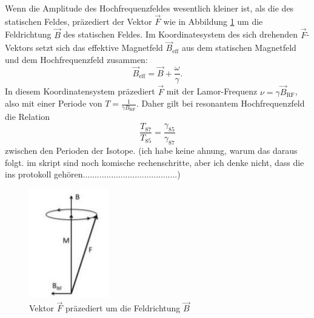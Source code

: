 Wenn die Amplitude des Hochfrequenzfeldes wesentlich kleiner ist, als die des statischen Feldes, präzediert der Vektor $\vec F$ wie in Abbildung \ref{abb:8} um die Feldrichtung $\vec{B}$ des statischen Feldes.
Im Koordinatesystem des sich drehenden $\vec{F}$-Vektors setzt sich das effektive Magnetfeld $\vec{B}_\text{eff}$ aus dem statischen Magnetfeld und dem Hochfrequenzfeld zusammen:
\begin{equation}
  \vec{B}_\text{eff}=\vec{B}+\frac{\omega}{\gamma}.
\end{equation}
In diesem Koordinatensystem präzediert $\vec{F}$ mit der Lamor-Frequenz $\nu=\gamma \vec{B}_\text{RF}$, also mit einer Periode von $T=\frac{1}{\gamma B_\text{RF} }$. Daher gilt bei resonantem Hochfrequenzfeld die Relation
\begin{equation}
  \frac{T_\text{87}}{T_\text{85}}=\frac{\gamma_\text{85}}{\gamma_\text{87}}
  \label{eq:verhaeltnis}
\end{equation}
zwischen den Perioden der Isotope. (ich habe keine ahnung, warum das daraus folgt. im skript sind noch komische rechenschritte, aber ich denke nicht, dass die ins protokoll gehören........................................)
\begin{figure}[H]
	\centering
	\includegraphics[width=3.5cm]{abb8.jpg}
	\caption{Vektor $\vec F$ präzediert um die Feldrichtung $\vec{B}$ \cite{V21}}
	\label{abb:8}
\end{figure}
